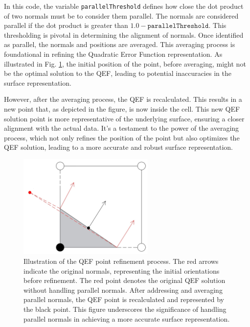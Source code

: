 In this code, the variable \texttt{parallelThreshold} defines how close the dot product of two normals must be to consider them parallel. The normals are considered parallel if the dot product is greater than \(1.0 - \texttt{parallelThreshold}\). This thresholding is pivotal in determining the alignment of normals. Once identified as parallel, the normals and positions are averaged. This averaging process is foundational in refining the Quadratic Error Function representation. As illustrated in Fig. \ref{fig:QEF-Handling-parallel-normals}, the initial position of the point, before averaging, might not be the optimal solution to the QEF, leading to potential inaccuracies in the surface representation.

However, after the averaging process, the QEF is recalculated. This results in a new point that, as depicted in the figure, is now inside the cell. This new QEF solution point is more representative of the underlying surface, ensuring a closer alignment with the actual data. It's a testament to the power of the averaging process, which not only refines the position of the point but also optimizes the QEF solution, leading to a more accurate and robust surface representation.


\begin{figure}
\centering
\includegraphics[width=0.6\textwidth]{Figures/aveg-parallal-normals.jpg}
\decoRule
\caption{Illustration of the QEF point refinement process. The red arrows indicate the original normals, representing the initial orientations before refinement. The red point denotes the original QEF solution without handling parallel normals. After addressing and averaging parallel normals, the QEF point is recalculated and represented by the black point. This figure underscores the significance of handling parallel normals in achieving a more accurate surface representation.}
\label{fig:QEF-Handling-parallel-normals}
\end{figure}

